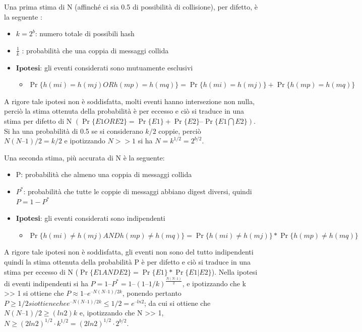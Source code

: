 Una prima stima di N (affinché ci sia 0.5 di possibilità di collisione), per difetto, è la seguente :
\begin{itemize}
\item $k = 2^{b}$: numero totale di possibili hash
\item $\frac{1}{k}$ : probabilità che una coppia di messaggi collida
\item $\textbf{Ipotesi}$: gli eventi considerati sono mutuamente esclusivi 
	\begin{itemize}
		\item $\Pr\{h(mi) = h(mj) \textit{OR} h(mp) = h(mq)\} = \Pr\{h(mi) = h(mj)\} + \Pr\{ h(mp) = h(mq)\}$
	\end{itemize}
\end{itemize}
 
A rigore tale ipotesi non è soddisfatta, molti eventi hanno intersezione non nulla, perciò la stima ottenuta della probabilità è per eccesso e ciò si traduce in una stima per difetto di N $(\Pr\{E1 OR E2\} = \Pr\{E1\} + \Pr\{E2\} – \Pr\{E1 \bigcap E2\})$.
Si ha una probabilità di 0.5 se si considerano $k/2$ coppie, perciò $N(N – 1)/2 = k/2$ e ipotizzando $N >> 1$ si ha $N = k^{1/2} = 2^{b/2}$.

Una seconda stima, più accurata di N è la seguente:
\begin{itemize}
\item P: probabilità che almeno una coppia di messaggi collida
\item $P^{*}$: probabilità che tutte le coppie di messaggi abbiano digest diversi, quindi $P = 1 - P^{*}$
\item \textbf{Ipotesi}: gli eventi considerati sono indipendenti
	\begin{itemize}
		\item $\Pr\{h(mi) \neq h(mj) \textit{AND} h(mp) \neq h(mq)\} = \Pr\{h(mi) \neq h(mj)\} * \Pr\{ h(mp) \neq h(mq)\}$
	\end{itemize}
\end{itemize}

A rigore tale ipotesi non è soddisfatta, gli eventi non sono del tutto indipendenti quindi la stima ottenuta della probabilità P è per difetto e ciò si traduce in una stima per eccesso di N ($\Pr\{E1 AND E2\} = \Pr\{E1\} * \Pr\{E1|E2\}$).
Nella ipotesi di eventi indipendenti si ha $P = 1 – P^{*} = 1 – (1 – 1/k)^{\frac{N(N – 1)}{2}}$, e ipotizzando che k >> 1 si ottiene che $P \approx 1 – e^{– N(N – 1)/2k}$, ponendo pertanto $P\geq1/2 si ottiene che e^{– N(N – 1)/2k} \leqslant 1/2 = e^{–ln2}$; da cui si ottiene che $N(N – 1)/2 \geq (ln2)k$ e, ipotizzando che N >> 1, $N \geqslant (2ln2)^{1/2} \cdot k^{1/2} = (2ln2)^{1/2} \cdot 2^{b/2}$.

